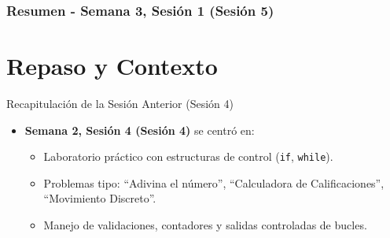 \documentclass[10pt]{beamer}
\begin{document}
\myfront{}

\begin{frame}
  \titlepage
\end{frame}

\begin{frame}
  \frametitle{Resumen - Semana 3, Sesión 1 (Sesión 5)}
  \tableofcontents
\end{frame}


\section{Repaso y Contexto}

\begin{frame}{Recapitulación de la Sesión Anterior (Sesión 4)}
  \begin{itemize}
    \item \textbf{Semana 2, Sesión 4 (Sesión 4)} se centró en:
      \begin{itemize}
        \item Laboratorio práctico con estructuras de control (\texttt{if}, \texttt{while}).
        \item Problemas tipo: “Adivina el número”, “Calculadora de Calificaciones”, “Movimiento Discreto”.
        \item Manejo de validaciones, contadores y salidas controladas de bucles.
      \end{itemize}
      
  \end{itemize}
\end{frame}
\end{document}
